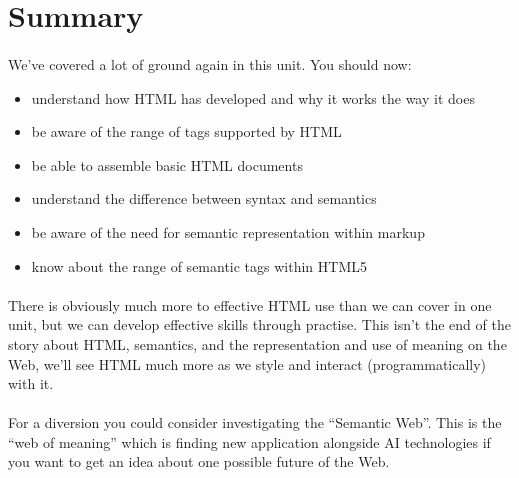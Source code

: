 \section{Summary}
\paragraph{} We've covered a lot of ground again in this unit. You should now: 

\begin{itemize}
\item understand how HTML has developed and why it works the way it does 
\item be aware of the range of tags supported by HTML 
\item be able to assemble basic HTML documents 
\item understand the difference between syntax and semantics
\item be aware of the need for semantic representation within markup
\item know about the range of semantic tags within HTML5
\end{itemize}
\paragraph{} There is obviously much more to effective HTML use than we can cover in one unit, but we can develop effective skills through practise. This isn’t the end of the story about HTML, semantics, and the representation and use of meaning on the Web, we’ll see HTML much more as we style and interact (programmatically) with it.

\paragraph{} For a diversion you could consider investigating the ``Semantic Web''. This is the ``web of meaning'' which is finding new application alongside AI technologies if you want to get an idea about one possible future of the Web.

